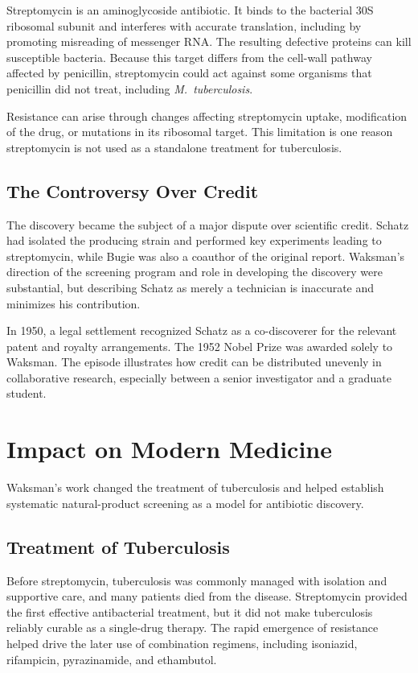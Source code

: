 Streptomycin is an aminoglycoside antibiotic. It binds to the bacterial 30S ribosomal subunit and interferes with accurate translation, including by promoting misreading of messenger RNA. The resulting defective proteins can kill susceptible bacteria. Because this target differs from the cell-wall pathway affected by penicillin, streptomycin could act against some organisms that penicillin did not treat, including \textit{M.~tuberculosis}.

Resistance can arise through changes affecting streptomycin uptake, modification of the drug, or mutations in its ribosomal target. This limitation is one reason streptomycin is not used as a standalone treatment for tuberculosis.

\subsection{The Controversy Over Credit}

The discovery became the subject of a major dispute over scientific credit. Schatz had isolated the producing strain and performed key experiments leading to streptomycin, while Bugie was also a coauthor of the original report. Waksman's direction of the screening program and role in developing the discovery were substantial, but describing Schatz as merely a technician is inaccurate and minimizes his contribution.

In 1950, a legal settlement recognized Schatz as a co-discoverer for the relevant patent and royalty arrangements. The 1952 Nobel Prize was awarded solely to Waksman. The episode illustrates how credit can be distributed unevenly in collaborative research, especially between a senior investigator and a graduate student.

\section{Impact on Modern Medicine}

Waksman's work changed the treatment of tuberculosis and helped establish systematic natural-product screening as a model for antibiotic discovery.

\subsection{Treatment of Tuberculosis}

Before streptomycin, tuberculosis was commonly managed with isolation and supportive care, and many patients died from the disease. Streptomycin provided the first effective antibacterial treatment, but it did not make tuberculosis reliably curable as a single-drug therapy. The rapid emergence of resistance helped drive the later use of combination regimens, including isoniazid, rifampicin, pyrazinamide, and ethambutol.

